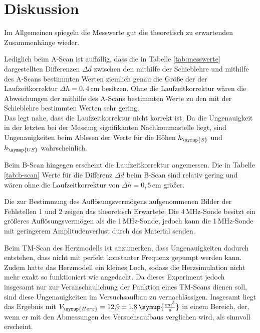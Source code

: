 \newpage
\section{Diskussion}
\label{sec:Diskussion}
Im Allgemeinen spiegeln die Messwerte gut die theoretisch zu erwartenden
Zusammenhänge wieder.

Lediglich beim A-Scan ist auffällig, dass die in Tabelle \ref{tab:messwerte}
dargestellten Differenzen $\Delta d$ zwischen den mithilfe der Schieblehre
und mithilfe des A-Scans bestimmten Werten ziemlich genau die Größe der
der Laufzeitkorrektur $\Delta h=0{,}4\,$cm besitzen. Ohne die Laufzeitkorrektur
wären die Abweichungen der mithilfe des A-Scans bestimmten Werte zu den mit der
Schieblehre bestimmten Werten sehr gering. \\
Das legt nahe, dass die Laufzeitkorrektur nicht korrekt ist. Da die Ungenauigkeit
in der letzten bei der Messung signifikanten Nachkommastelle liegt, sind Ungenauigkeiten
beim Ablesen der Werte für die Höhen $h_{\symup{S}}$ und $h_{\symup{US}}$ wahrscheinlich.

Beim B-Scan hingegen erscheint die Laufzeitkorrektur angemessen. Die in Tabelle
\ref{tab:b-scan} Werte für die Differenz $\Delta d$ beim B-Scan sind relativ gering
und wären ohne die Laufzeitkorrektur von $\Delta h=0{,}5\,$cm größer.

Die zur Bestimmung des Auflösungsvermögens aufgenommenen Bilder der Fehlstellen 1
und 2 zeigen das theoretisch Erwartete: Die 4\,MHz-Sonde besitzt ein größeres
Auflösungsvermögen als die 1\,MHz-Sonde, jedoch kann die 1\,MHz-Sonde mit geringerem
Amplitudenverlust durch das Material senden.

Beim TM-Scan des Herzmodells ist anzumerken, dass Ungenauigkeiten dadurch entstehen,
dass nicht mit perfekt konstanter Frequenz gepumpt werden kann. Zudem hatte das
Herzmodell ein kleines Loch, sodass die Herzsimulation nicht mehr exakt so funktioniert
wie angedacht. Da dieses Experiment jedoch insgesamt nur zur Veranschaulichung der
Funktion eines TM-Scans dienen soll, sind diese Ungenauigkeiten im Versuchsaufbau
zu vernachlässigen. Insgesamt liegt das Ergebnis mit $V_{\symup{Herz}}=12{,}9\pm1{,}8\,
\symup{\frac{cm^3}{s}}$ in einem Bereich, der, wenn er mit den Abmessungen des
Versuchsaufbaus verglichen wird, als sinnvoll erscheint.

